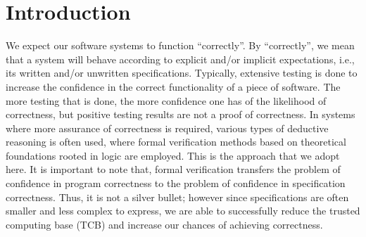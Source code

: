 \documentclass[compsoc,conference,a4paper,10pt,times]{IEEEtran}
\begin{document}
\section{Introduction}
We expect our software systems to function ``correctly''. By ``correctly'', we mean that a system will behave according to explicit and/or implicit expectations, i.e., its written and/or unwritten specifications. Typically, extensive testing is done to increase the confidence in the correct functionality of a piece of software.
The more testing that is done, the more confidence one has of the likelihood of correctness, but positive testing results are not a proof of correctness.
In systems where more assurance of correctness is required, various types of deductive reasoning is often used, where formal verification methods based on theoretical foundations rooted in logic are employed. This is the approach that we adopt here.  It is important to note that, formal verification transfers the problem of confidence in program correctness to the problem of confidence in specification correctness.  Thus, it is not a silver bullet; however since specifications are often smaller and less complex to express, we are able to successfully reduce the trusted computing base (TCB) and increase our chances of achieving correctness.
\end{document}
